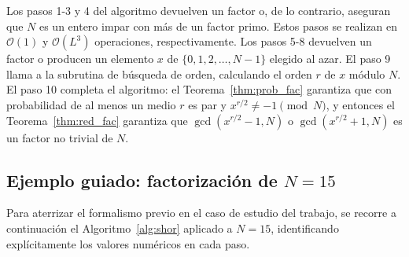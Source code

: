 \documentclass[12pt, spanish]{book}
\begin{document}
Los pasos 1-3 y 4 del algoritmo devuelven un factor o, de lo contrario, aseguran que $N$ es un entero impar con más de un factor primo. Estos pasos se realizan en $\mathcal{O}(1)$ y $\mathcal{O}(L^3)$ operaciones, respectivamente. Los pasos 5-8 devuelven un factor o producen un elemento $x$ de $\{0, 1, 2, \dots, N - 1\}$ elegido al azar. El paso 9 llama a la subrutina de búsqueda de orden, calculando el orden $r$ de $x$ módulo $N$. El paso 10 completa el algoritmo: el Teorema~\ref{thm:prob_fac} garantiza que con probabilidad de al menos un medio $r$ es par y $x^{r/2} \neq -1 \pmod N$, y entonces el Teorema~\ref{thm:red_fac} garantiza que $\gcd(x^{r/2} - 1, N)$ o $\gcd(x^{r/2} + 1, N)$ es un factor no trivial de $N$.

\subsection{Ejemplo guiado: factorización de \texorpdfstring{$N=15$}{N=15}}
\label{sec:ejemplo_n15}

Para aterrizar el formalismo previo en el caso de estudio del trabajo, se recorre a continuación el Algoritmo~\ref{alg:shor} aplicado a $N = 15$, identificando explícitamente los valores numéricos en cada paso.\\
\end{document}
